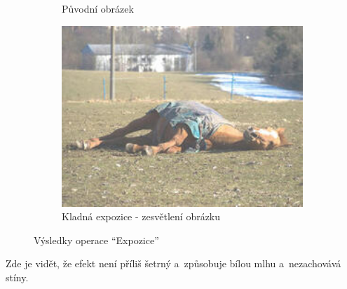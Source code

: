 \documentclass[11pt, a4paper, titlepage]{article}
\renewcommand{\uv}[1]{``#1''}
\begin{document}
\begin{figure}[h]
\begin{subfigure}[t]{0.25\textwidth}
        \caption{Původní obrázek}
    \end{subfigure}
    \hspace{1cm}
    \begin{subfigure}[t]{0.25\textwidth}
        \vskip 0pt
        \includegraphics[width=1.0\textwidth]{horse_exposure_plus.jpg}
        \caption{Kladná expozice - zesvětlení obrázku}
    \end{subfigure}
    \caption{Výsledky operace \uv{Expozice}}
    \label{fig:exposure}
\end{figure}
Zde je vidět, že efekt není příliš šetrný a~způsobuje bílou mlhu a~nezachovává stíny.
\end{document}

